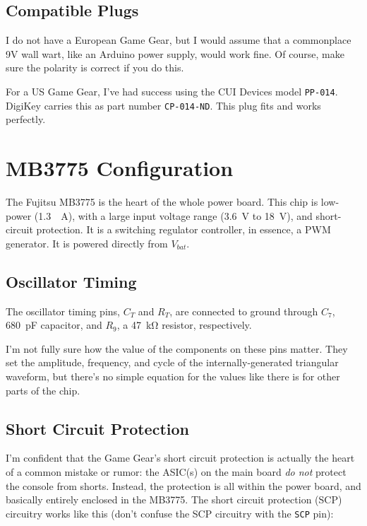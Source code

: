 \documentclass{article}
\newcommand{\Vbat}{$V_{bat}$}
\newcommand{\chippin}{\texttt}
\begin{document}
\subsection{Compatible Plugs}
I do not have a European Game Gear, but I would assume that a
commonplace 9V wall wart, like an Arduino power supply, would work
fine. Of course, make sure the polarity is correct if you do this.

For a US Game Gear, I've had success using the CUI Devices model
\texttt{PP-014}. DigiKey carries this as part number
\texttt{CP-014-ND}. This plug fits and works perfectly.

\section{MB3775 Configuration}
The Fujitsu MB3775 is the heart of the whole power board. This chip is
low-power (\qty{1.3}{\milli{}A}), with a large input voltage range
(\qty{3.6}{\volt} to \qty{18}{\volt}), and short-circuit
protection. It is a switching regulator controller, in essence, a PWM
generator. It is powered directly from \Vbat{}.

\subsection{Oscillator Timing}
The oscillator timing pins, $C_T$ and $R_T$, are connected to ground
through $C_7$, \qty{680}{\pico\farad} capacitor, and $R_9$, a
\qty{47}{\kilo\ohm} resistor, respectively.

I'm not fully sure how the value of the components on these pins
matter. They set the amplitude, frequency, and cycle of the
internally-generated triangular waveform, but there's no simple
equation for the values like there is for other parts of the chip.

\subsection{Short Circuit Protection}
I'm confident that the Game Gear's short circuit protection is
actually the heart of a common mistake or rumor: the ASIC(s) on the
main board \emph{do not} protect the console from shorts. Instead, the
protection is all within the power board, and basically entirely
enclosed in the MB3775. The short circuit protection (SCP) circuitry
works like this (don't confuse the SCP circuitry with the
\chippin{SCP} pin):
\end{document}
